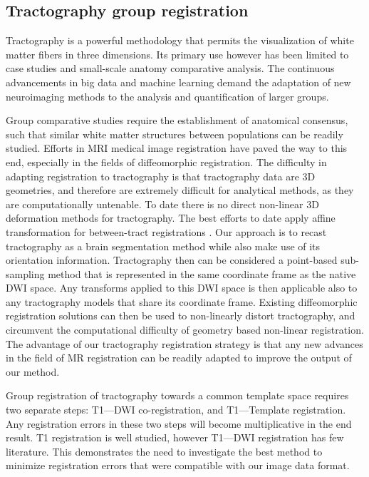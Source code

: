 \subsection{Tractography group registration}
Tractography is a powerful methodology that permits the visualization of white matter fibers in three dimensions. Its primary use however has been limited to case studies and small-scale anatomy comparative analysis. The continuous advancements in big data and machine learning demand the adaptation of new neuroimaging methods to the analysis and quantification of larger groups.

Group comparative studies require the establishment of anatomical consensus, such that similar white matter structures between populations can be readily studied. Efforts in MRI medical image registration have paved the way to this end, especially in the fields of diffeomorphic registration. The difficulty in adapting registration to tractography is that tractography data are 3D geometries, and therefore are extremely difficult for analytical methods, as they are computationally untenable. To date there is no direct non-linear 3D deformation methods for tractography. The best efforts to date apply affine transformation for between-tract registrations \cite{Garyfallidis2015}. Our approach is to recast tractography as a brain segmentation method while also make use of its orientation information. Tractography then can be considered a point-based sub-sampling method that is represented in the same coordinate frame as the native DWI space. Any transforms applied to this DWI space is then applicable also to any tractography models that share its coordinate frame. Existing diffeomorphic registration solutions can then be used to non-linearly distort tractography, and circumvent the computational difficulty of geometry based non-linear registration. The advantage of our tractography registration strategy is that any new advances in the field of MR registration can be readily adapted to improve the output of our method. 

Group registration of tractography towards a common template space requires two separate steps: T1---DWI co-registration, and T1---Template registration. Any registration errors in these two steps will become multiplicative in the end result. T1 registration is well studied, however T1---DWI registration has few literature. This demonstrates the need to investigate the best method to minimize registration errors that were compatible with our image data format.

